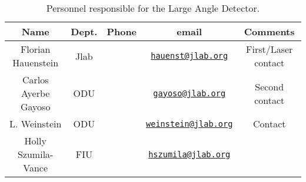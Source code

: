 \begin{table}[!htb]
 \centering
 \begin{tabular}{|c|c|c|c|c|}
\hline
 Name&Dept.&Phone&email&Comments \\ \hline
 Florian Hauenstein & Jlab & & \href{mailto:hauenst@jlab.org}{\nolinkurl{hauenst@jlab.org}} &  First/Laser contact\\ \hline
Carlos Ayerbe Gayoso  & ODU & & \href{mailto:gayoso@jlab.org}{\nolinkurl{gayoso@jlab.org}} & Second contact \\ \hline
 L.  Weinstein & ODU &  &\href{mailto:weinstein@jlab.org}{\nolinkurl{weinstein@jlab.org}}& Contact  \\ \hline
 Holly Szumila-Vance & FIU &  &\href{mailto:hszumila@jlab.org}{\nolinkurl{hszumila@jlab.org}}& \\ \hline
 \end{tabular}
\caption{Personnel responsible for the Large Angle Detector.} 
\label{tb:lad}
\end{table}

